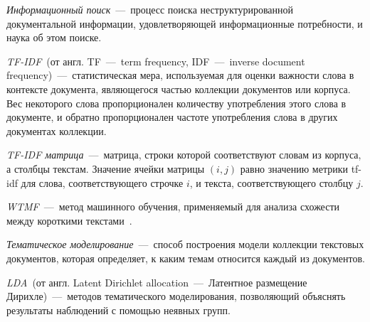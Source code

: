     \textit{Информационный поиск}~---~процесс поиска неструктурированной документальной информации, удовлетворяющей информационные потребности, и наука об этом поиске.

    \textit{TF-IDF}~(от англ. TF~---~term frequency, IDF~---~inverse document frequency)~---~статистическая мера, используемая для оценки важности слова в контексте документа,
    являющегося частью коллекции документов или корпуса.
    Вес некоторого слова пропорционален количеству употребления этого слова в документе, и обратно пропорционален частоте употребления слова в других документах коллекции.

    \textit{TF-IDF матрица}~---~матрица, строки которой соответствуют словам из корпуса, а столбцы текстам.
    Значение ячейки матрицы $(i,j)$ равно значению метрики tf-idf для слова, соответствующего строчке $i$, и текста, соответствующего столбцу $j$.

    \textit{WTMF}~---~метод машинного обучения, применяемый для анализа схожести между короткими текстами~\cite{wtmf}.

    \textit{Тематическое моделирование}~---~способ построения модели коллекции текстовых документов, которая определяет, к каким темам относится каждый из документов.

    \textit{LDA}~(от англ. Latent Dirichlet allocation~---~Латентное размещение Дирихле)~---~методов тематического моделирования,
    позволяющий объяснять результаты наблюдений с помощью неявных групп.



%
%
%

%
%


